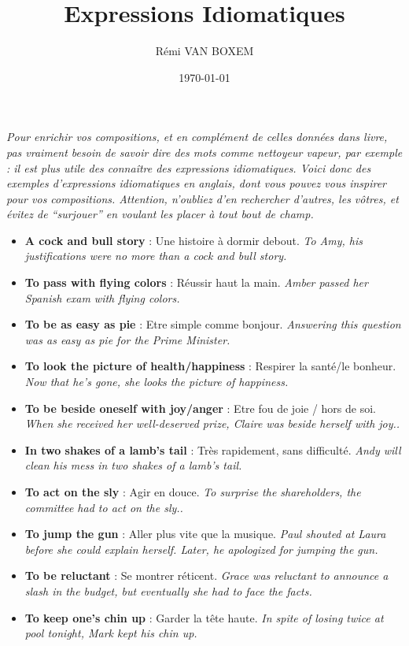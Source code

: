 \documentclass[11pt]{article}
\author{Rémi VAN BOXEM}
\date{\today}
\title{Expressions Idiomatiques}
\begin{document}
\maketitle
\tableofcontents

\emph{Pour enrichir vos compositions, et en complément de celles données dans livre, pas vraiment besoin de savoir dire des mots comme nettoyeur vapeur, par exemple : il est plus utile des connaître des expressions idiomatiques. Voici donc des exemples d’expressions idiomatiques en anglais, dont vous pouvez vous inspirer pour vos compositions. Attention, n’oubliez d’en rechercher d’autres, les vôtres, et évitez de “surjouer” en voulant les placer à tout bout de champ.}

\begin{itemize}
\item \textbf{A cock and bull story} : Une histoire à dormir debout. \emph{To Amy, his justifications were no more than a cock and bull story.}
\item \textbf{To pass with flying colors} : Réussir haut la main. \emph{Amber passed her Spanish exam with flying colors.}
\item \textbf{To be as easy as pie} : Etre simple comme bonjour. \emph{Answering this question was as easy as pie for the Prime Minister.}
\item \textbf{To look the picture of health/happiness} : Respirer la santé/le bonheur. \emph{Now that he’s gone, she looks the picture of happiness.}
\item \textbf{To be beside oneself with joy/anger} : Etre fou de joie / hors de soi. \emph{When she received her well-deserved prize, Claire was beside herself with joy..}
\item \textbf{In two shakes of a lamb’s tail} : Très rapidement, sans difficulté. \emph{Andy will clean his mess in two shakes of a lamb’s tail.}
\item \textbf{To act on the sly} : Agir en douce. \emph{To surprise the shareholders, the committee had to act on the sly..}
\item \textbf{To jump the gun} : Aller plus vite que la musique. \emph{Paul shouted at Laura before she could explain herself. Later, he apologized for jumping the gun.}
\item \textbf{To be reluctant} : Se montrer réticent. \emph{Grace was reluctant to announce a slash in the budget, but eventually she had to face the facts.}
\item \textbf{To keep one’s chin up} : Garder la tête haute. \emph{In spite of losing twice at pool tonight, Mark kept his chin up.}

\end{itemize}
\end{document}
